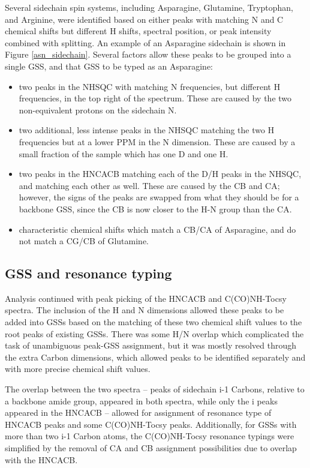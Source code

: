Several sidechain spin systems, including Asparagine, Glutamine, Tryptophan,
and Arginine, were identified based on either peaks with matching N and C
chemical shifts but different H shifts, spectral position, or peak intensity
combined with splitting.  An example of an Asparagine sidechain is shown in
Figure \ref{asn_sidechain}.  Several factors allow these peaks to be grouped
into a single GSS, and that GSS to be typed as an Asparagine:
\begin{itemize}
  \item two peaks in the NHSQC with matching N frequencies, but different H
    frequencies, in the top right of the spectrum.  These are caused by the
    two non-equivalent protons on the sidechain N.
  \item two additional, less intense peaks in the NHSQC matching the two
    H frequencies but at a lower PPM in the N dimension.  These are caused by
    a small fraction of the sample which has one D and one H.
  \item two peaks in the HNCACB matching each of the D/H peaks in the NHSQC,
    and matching each other as well.  These are caused by the CB and CA; 
    however, the signs of the peaks are swapped from what they should be for
    a backbone GSS, since the CB is now closer to the H-N group than the CA.
  \item characteristic chemical shifts which match a CB/CA of Asparagine, 
    and do not match a CG/CB of Glutamine.
\end{itemize}

\subsection{GSS and resonance typing}
Analysis continued with peak picking of the HNCACB and C(CO)NH-Tocsy spectra.
The inclusion of the H and N dimensions allowed these peaks to be added into
GSSs based on the matching of these two chemical shift values to the
root peaks of existing GSSs.  There was some H/N overlap which complicated the
task of unambiguous peak-GSS assignment, but it was mostly resolved through
the extra Carbon dimensions, which allowed peaks to be identified separately
and with more precise chemical shift values.

The overlap between the two spectra -- peaks of sidechain i-1 Carbons, relative
to a backbone amide group, appeared in both spectra, while only the i peaks
appeared in the HNCACB -- allowed for assignment of resonance type of HNCACB
peaks and some C(CO)NH-Tocsy peaks.  Additionally, for GSSs with more than two
i-1 Carbon atoms, the C(CO)NH-Tocsy resonance typings were simplified by the
removal of CA and CB assignment possibilities due to overlap with the HNCACB.

